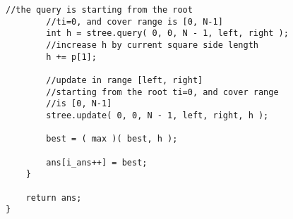 \begin{lstlisting}[style=customc, caption={Segment Tree}]
        //the query is starting from the root
        //ti=0, and cover range is [0, N-1]
        int h = stree.query( 0, 0, N - 1, left, right );
        //increase h by current square side length
        h += p[1];

        //update in range [left, right]
        //starting from the root ti=0, and cover range
        //is [0, N-1]
        stree.update( 0, 0, N - 1, left, right, h );

        best = ( max )( best, h );

        ans[i_ans++] = best;
    }

    return ans;
}
\end{lstlisting}